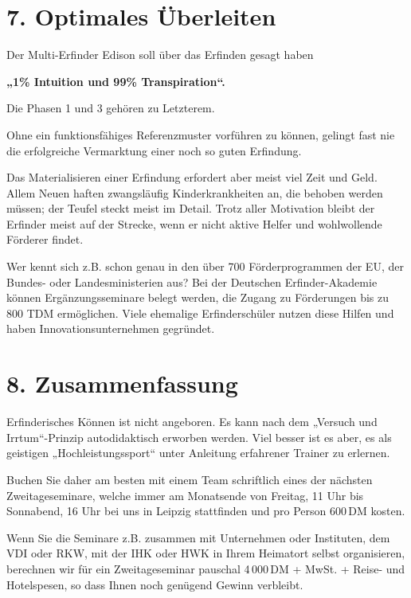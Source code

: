 \documentclass[11pt,a4paper]{article}
\begin{document}
\section*{7. Optimales Überleiten}

Der Multi-Erfinder Edison soll über das Erfinden gesagt haben
\begin{center}\bf  
  „1\% Intuition und  99\% Transpiration“.
\end{center}
Die Phasen 1 und 3 gehören zu Letzterem.

Ohne ein funktionsfähiges Referenzmuster vorführen zu können, gelingt fast
nie die erfolgreiche Vermarktung einer noch so guten Erfindung.

Das Materialisieren einer Erfindung erfordert aber meist viel Zeit und Geld.
Allem Neuen haften zwangsläufig Kinderkrankheiten an, die behoben werden
müssen; der Teufel steckt meist im Detail.  Trotz aller Motivation bleibt der
Erfinder meist auf der Strecke, wenn er nicht aktive Helfer und wohlwollende
Förderer findet.

Wer kennt sich z.B.  schon genau in den über 700 Förderprogrammen der EU, der
Bundes- oder Landesministerien aus?  Bei der Deutschen Erfinder-Akademie
können Ergänzungsseminare belegt werden, die Zugang zu Förderungen bis zu 800
TDM ermöglichen. Viele ehemalige Erfinderschüler nutzen diese Hilfen und haben
Innovationsunternehmen gegründet.

\section*{8. Zusammenfassung}

Erfinderisches Können ist nicht angeboren.  Es kann nach dem „Versuch und
Irrtum“-Prinzip autodidaktisch erworben werden.  Viel besser ist es aber, es
als geistigen „Hochleistungssport“ unter Anleitung erfahrener Trainer zu
erlernen.

Buchen Sie daher am besten mit einem Team schriftlich eines der nächsten
Zweitageseminare, welche immer am Monatsende von Freitag, 11 Uhr bis
Sonnabend, 16 Uhr bei uns in Leipzig stattfinden und pro Person 600\,DM
kosten.


Wenn Sie die Seminare z.B. zusammen mit Unternehmen oder Instituten, dem VDI
oder RKW, mit der IHK oder HWK in Ihrem Heimatort selbst organisieren,
berechnen wir für ein Zweitageseminar pauschal 4\,000\,DM + MwSt. + Reise- und
Hotelspesen, so dass Ihnen noch genügend Gewinn verbleibt.
\end{document}
